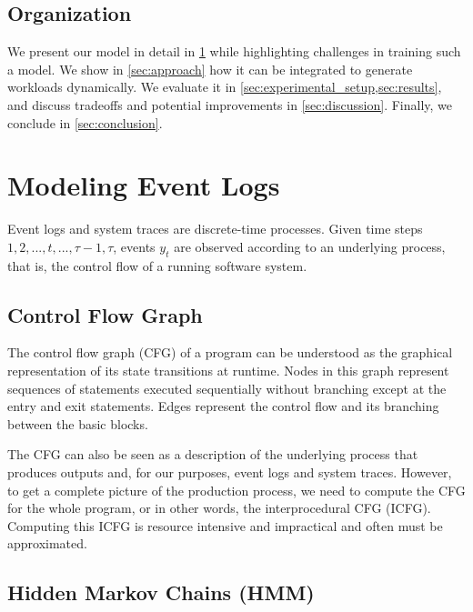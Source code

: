 \subsection{Organization}

We present our model in detail in \cref{sec:modeling_processes} while highlighting challenges in training such a model. We show in \cref{sec:approach} how it can be integrated to generate workloads dynamically. We evaluate it in \cref{sec:experimental_setup,sec:results}, and discuss tradeoffs and potential improvements in \cref{sec:discussion}. Finally, we conclude in \cref{sec:conclusion}.

\section{Modeling Event Logs}\label{sec:modeling_processes}

Event logs and system traces are discrete-time processes. Given time steps \(1, 2, ..., t, ..., \tau - 1, \tau\),  events \(y_t\) are observed according to an underlying process, that is, the control flow of a running software system.

\subsection{Control Flow Graph}

The control flow graph (CFG) of a program can be understood as the graphical representation of its state transitions at runtime. Nodes in this graph represent sequences of statements executed sequentially without branching except at the entry and exit statements. Edges represent the control flow and its branching between the basic blocks.

The CFG can also be seen as a description of the underlying process that produces outputs and, for our purposes, event logs and system traces. However, to get a complete picture of the production process, we need to compute the CFG for the whole program, or in other words, the interprocedural CFG (ICFG). Computing this ICFG is resource intensive and impractical and often must be approximated\cite{Zhao2023-nh}.

\subsection{Hidden Markov Chains (HMM)}

